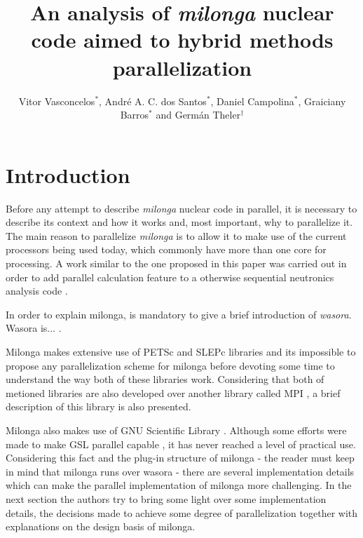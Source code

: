 \documentclass{anstrans}
\title{An analysis of \textit{milonga} nuclear code aimed to hybrid methods parallelization}
\author{Vitor Vasconcelos$^{*}$, Andr\'e A. C. dos Santos$^{*}$, Daniel Campolina$^{*}$, Graiciany Barros$^{*}$ and Germ\'an Theler$^{\dagger}$}
\institute{
$^{*}$Centro de Desenvolvimento da Tecnologia Nuclear, CEP 31270-901,
Belo Horizonte - MG, Brazil
\and
$^{\dagger}$Seamplex, Rafaela, Argentina
}
\begin{document}
\vspace*{-42pt}
\begin{strip}
\vspace*{14pt}
\end{strip}


\section{Introduction}

Before any attempt to describe \textit{milonga} nuclear code in parallel, it is
necessary to describe its context and how it works and, most important, why to parallelize
it. The main reason to parallelize \textit{milonga} is to allow it to make use
of the current processors being used today, which commonly have more than one core
for processing. A work similar to the one proposed in this paper was carried out
in order to add parallel calculation feature to a otherwise sequential neutronics
analysis code \cite{Gonzalez2018}.

In order to explain milonga, is mandatory to give a brief introduction of \textit{wasora}.
Wasora is... \cite{wasora}.


Milonga makes extensive use of PETSc \cite{petsc} and SLEPc \cite{Hernandez2005} libraries and
its impossible to propose any parallelization scheme for milonga before devoting some
time to understand the way both of these libraries work. Considering that both of
metioned libraries are also developed over another library called MPI \cite{MPI}, a brief
description of this library is also presented. 

Milonga also makes use of GNU Scientific Library \cite{gsl2016}. Although some efforts were made to make
GSL parallel capable \cite{Aliaga2004}, it has never reached a level of practical use. Considering
this fact and the plug-in structure of milonga - the reader must keep in mind that milonga runs
over wasora - there are several implementation details which can make the parallel implementation
of milonga more challenging. In the next section the authors try to bring some light over some
implementation details, the decisions made to achieve some degree of parallelization together with
explanations on the design basis of milonga.

\end{document}
